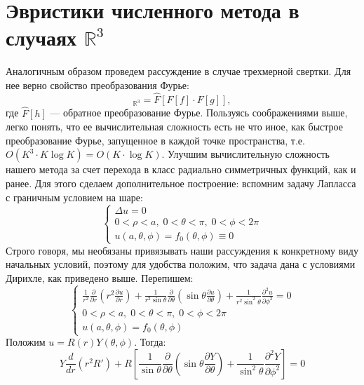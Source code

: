 \section{Эвристики численного метода в случаях $ \mathbb{R}^3 $}

Аналогичным образом проведем рассуждение в случае трехмерной свертки. Для нее верно свойство преобразования Фурье: 
\begin{equation*}
[f*g]_{\mathbb{R}^{3}}=\hat{F}[F[f]\cdot F[g]],
\end{equation*}
где $\hat{F}[h]$ --- обратное преобразование Фурье. Пользуясь соображениями выше, легко понять, что ее вычислительная сложность есть не что иное, как быстрое преобразование Фурье, запущенное в каждой точке пространства, т.е. $ O(K^{3}\cdot K\log K)=O(K\cdot\log K) $. Улучшим вычислительную сложность нашего метода за счет перехода в класс радиально симметричных функций, как и ранее. Для этого сделаем дополнительное построение: вспомним задачу Лапласса с граничным условием на шаре:
\begin{equation*}
\begin{cases}
	\Delta u=0\\
	0<\rho<a,\;0<\theta<\pi,\;0<\phi<2\pi\\
	u(a,\theta,\phi)=f_{0}(\theta,\phi)\equiv0
\end{cases}
\end{equation*}
Строго говоря, мы необязаны привязывать наши рассуждения к конкретному виду начальных условий, поэтому для удобства положим, что задача дана с условиями Дирихле, как приведено выше. Перепишем:
\begin{equation*}
\begin{cases}
\frac{1}{r^2} \frac{\partial}{\partial r}\left(r^2 \frac{\partial u}{\partial r}\right) + \frac{1}{r^2 \sin \theta} \frac{\partial}{\partial \theta }\left(\sin \theta \frac{\partial u}{\partial \theta }\right)+\frac{1}{r^2 \sin^2 \theta } \frac{\partial^2 u}{\partial \phi^2}=0\\
0<\rho<a,\;0<\theta<\pi,\;0<\phi<2\pi\\
u(a,\theta,\phi)=f_{0}(\theta,\phi)
\end{cases}
\end{equation*}
Положим $u=R(r)Y(\theta, \phi)$. Тогда:
\begin{equation*}
Y \frac{d}{dr}(r^2 R')+R\left[ \frac{1}{ \sin \theta} \frac{\partial}{\partial \theta }\left(\sin \theta \frac{\partial Y}{\partial \theta }\right)+\frac{1}{\sin^2 \theta } \frac{\partial^2 Y}{\partial \phi^2}\right]=0
\end{equation*}
